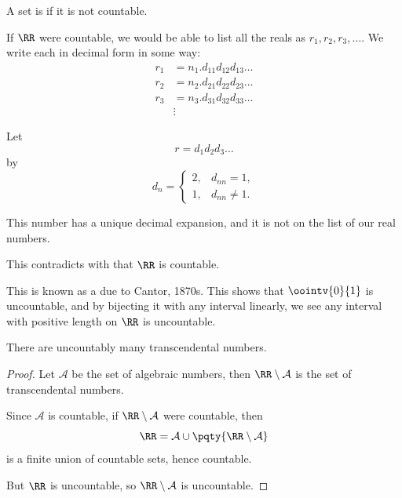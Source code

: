 \begin{definition}
    A set is  if it is not countable.
\end{definition}

\begin{theorem}[\(\RR\) is uncountable]
    If \(\RR\) were countable, we would be able to list all the reals as \(r_1, r_2, r_3, \ldots\). We write each in decimal form in some way:
    \begin{align*}
        r_1 &= n_1.\boxed{d_{11}} d_{12} d_{13} \ldots \\
        r_2 &= n_2.d_{21} \boxed{d_{22}} d_{23} \ldots \\
        r_3 &= n_3.d_{31} d_{32} \boxed{d_{33}} \ldots \\
            & \vdots
    \end{align*}

    Let
    \[
        r = d_1 d_2 d_3 \ldots
    \]
    by
    \[
        d_n = \begin{cases}
            2, & d_{nn} = 1, \\
            1, & d_{nn} \neq 1.
        \end{cases}
    \]

    This number has a unique decimal expansion, and it is not on the list of our real numbers.

    This contradicts with that \(\RR\) is countable.
\end{theorem}

This is known as a  due to Cantor, 1870s. This shows that \(\oointv{0}{1}\) is uncountable, and by bijecting it with any interval linearly, we see any interval with positive length on \(\RR\) is uncountable.

\begin{corollary}
    There are uncountably many transcendental numbers.
\end{corollary}

\begin{proof}
    Let \(\mathcal{A}\) be the set of algebraic numbers, then \(\RR \setminus \mathcal{A}\) is the set of transcendental numbers.

    Since \(\mathcal{A}\) is countable, if \(\RR \setminus \mathcal{A}\) were countable, then
    \[
        \RR = \mathcal{A} \cup \pqty{\RR \setminus \mathcal{A}}
    \]
    is a finite union of countable sets, hence countable.

    But \(\RR\) is uncountable, so \(\RR \setminus \mathcal{A}\) is uncountable.
\end{proof}

